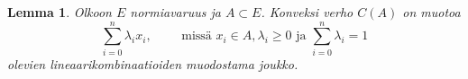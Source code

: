\documentclass[12pt,a4paper,leqno]{report}
\theoremstyle{plain}
\newtheorem{lem}[equation]{Lemma}
\theoremstyle{definition}
\theoremstyle{remark}
\begin{document}
\begin{lem}\label{konveksilineaari} Olkoon $E$ normiavaruus ja $A\subset E$. 
Konveksi verho $C(A)$ on muotoa 
$$\sum_{i=0}^n \lambda_i x_i,\qquad \text{ missä } x_i\in A, \lambda_i\geq0\text{ ja } \sum_{i=0}^n \lambda_i =1 $$ 
olevien lineaarikombinaatioiden muodostama joukko.
\end{lem}
\end{document}
